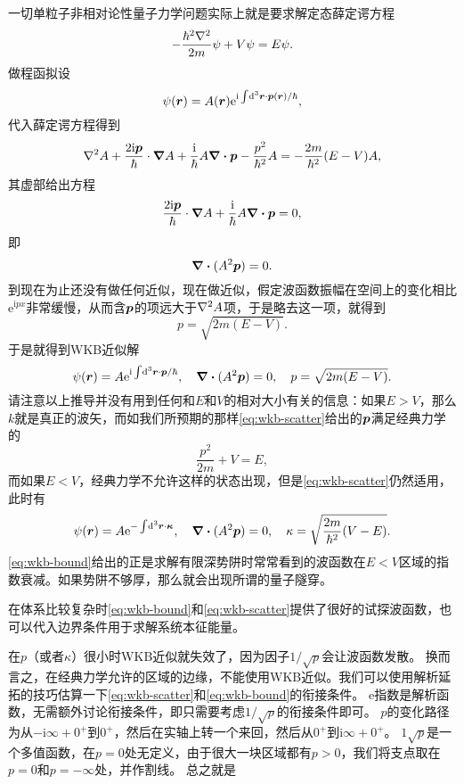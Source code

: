\documentclass[UTF8, a4paper]{ctexart}
\newcommand*{\ee}{\mathrm{e}}
\newcommand*{\ii}{\mathrm{i}}
\begin{document}
一切单粒子非相对论性量子力学问题实际上就是要求解定态薛定谔方程
\begin{equation}
    - \frac{\hbar^2 \laplacian}{2m} \psi + V \psi = E \psi.
\end{equation}
做程函拟设
\[
    \psi(\vb*{r}) = A(\vb*{r}) \ee^{\ii \int \dd[3]{\vb*{r}} \cdot \vb*{p}(\vb*{r}) / \hbar },
\]
代入薛定谔方程得到
\[
    \laplacian{A} + \frac{2 \ii \vb*{p}}{\hbar} \cdot \grad{A} + \frac{\ii}{\hbar} A \div{\vb*{p}} - \frac{p^2}{\hbar^2} A = - \frac{2m}{\hbar^2} (E - V) A,
\]
其虚部给出方程
\[
    \frac{2 \ii \vb*{p}}{\hbar} \cdot \grad{A} + \frac{\ii}{\hbar} A \div{\vb*{p}} = 0,
\]
即
\[
    \div{(A^2 \vb*{p})} = 0.
\]
到现在为止还没有做任何近似，现在做近似，假定波函数振幅在空间上的变化相比$\ee^{\ii p x}$非常缓慢，从而含$\vb*{p}$的项远大于$\laplacian{A}$项，于是略去这一项，就得到
\[
    p = \sqrt{2m (E-V)}.
\]
于是就得到WKB近似解
\begin{equation}
    \psi(\vb*{r}) = A \ee^{\ii \int \dd[3]{\vb*{r}} \cdot \vb*{p} / \hbar}, \quad \div{(A^2 \vb*{p})} = 0, \quad p = \sqrt{2m (E-V)}.
    \label{eq:wkb-scatter}
\end{equation}
请注意以上推导并没有用到任何和$E$和$V$的相对大小有关的信息：如果$E>V$，那么$k$就是真正的波矢，而如我们所预期的那样\eqref{eq:wkb-scatter}给出的$\vb*{p}$满足经典力学的
\[
    \frac{p^2}{2m} + V = E,
\]
而如果$E < V$，经典力学不允许这样的状态出现，但是\eqref{eq:wkb-scatter}仍然适用，此时有
\begin{equation}
    \psi(\vb*{r}) = A \ee^{- \int \dd[3]{\vb*{r}} \cdot \vb*{\kappa}}, \quad \div{(A^2 \vb*{p})} = 0, \quad \kappa = \sqrt{\frac{2m}{\hbar^2} (V - E)}.
    \label{eq:wkb-bound}
\end{equation}
\eqref{eq:wkb-bound}给出的正是求解有限深势阱时常常看到的波函数在$E<V$区域的指数衰减。如果势阱不够厚，那么就会出现所谓的量子隧穿。

在体系比较复杂时\eqref{eq:wkb-bound}和\eqref{eq:wkb-scatter}提供了很好的试探波函数，也可以代入边界条件用于求解系统本征能量。

在$p$（或者$\kappa$）很小时WKB近似就失效了，因为因子$1/\sqrt{p}$会让波函数发散。
换而言之，在经典力学允许的区域的边缘，不能使用WKB近似。我们可以使用解析延拓的技巧估算一下\eqref{eq:wkb-scatter}和\eqref{eq:wkb-bound}的衔接条件。%
$\ee$指数是解析函数，无需额外讨论衔接条件，即只需要考虑$1/\sqrt{p}$的衔接条件即可。
$p$的变化路径为从$-\ii \infty + 0^+$到$0^+$，然后在实轴上转一个来回，然后从$0^+$到$\ii \infty + 0^+$。
$1\sqrt{p}$是一个多值函数，在$p=0$处无定义，由于很大一块区域都有$p>0$，我们将支点取在$p=0$和$p=-\infty$处，并作割线。
总之就是
\end{document}
